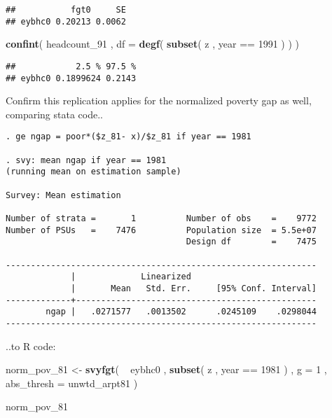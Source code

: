 \documentclass[]{book}
\newenvironment{Shaded}{\begin{snugshade}}{\end{snugshade}}
\newcommand{\KeywordTok}[1]{\textcolor[rgb]{0.13,0.29,0.53}{\textbf{{#1}}}}
\newcommand{\DataTypeTok}[1]{\textcolor[rgb]{0.13,0.29,0.53}{{#1}}}
\newcommand{\DecValTok}[1]{\textcolor[rgb]{0.00,0.00,0.81}{{#1}}}
\newcommand{\StringTok}[1]{\textcolor[rgb]{0.31,0.60,0.02}{{#1}}}
\newcommand{\NormalTok}[1]{{#1}}
\theoremstyle{definition}
\theoremstyle{definition}
\theoremstyle{remark}
\begin{document}
\begin{verbatim}
##           fgt0     SE
## eybhc0 0.20213 0.0062
\end{verbatim}

\begin{Shaded}
\begin{Highlighting}[]
\KeywordTok{confint}\NormalTok{( headcount_91 , }\DataTypeTok{df =} \KeywordTok{degf}\NormalTok{( }\KeywordTok{subset}\NormalTok{( z , year ==}\StringTok{ }\DecValTok{1991} \NormalTok{) ) )}
\end{Highlighting}
\end{Shaded}

\begin{verbatim}
##            2.5 % 97.5 %
## eybhc0 0.1899624 0.2143
\end{verbatim}

Confirm this replication applies for the normalized poverty gap as well,
comparing stata code..

\begin{verbatim}
. ge ngap = poor*($z_81- x)/$z_81 if year == 1981

. svy: mean ngap if year == 1981
(running mean on estimation sample)

Survey: Mean estimation

Number of strata =       1          Number of obs    =    9772
Number of PSUs   =    7476          Population size  = 5.5e+07
                                    Design df        =    7475

--------------------------------------------------------------
             |             Linearized
             |       Mean   Std. Err.     [95% Conf. Interval]
-------------+------------------------------------------------
        ngap |   .0271577   .0013502      .0245109    .0298044
--------------------------------------------------------------
\end{verbatim}

..to R code:

\begin{Shaded}
\begin{Highlighting}[]
\NormalTok{norm_pov_81 <-}\StringTok{ }
\StringTok{    }\KeywordTok{svyfgt}\NormalTok{( }
        \NormalTok{~}\StringTok{ }\NormalTok{eybhc0 , }
        \KeywordTok{subset}\NormalTok{( z , year ==}\StringTok{ }\DecValTok{1981} \NormalTok{) , }
        \DataTypeTok{g =} \DecValTok{1} \NormalTok{, }
        \DataTypeTok{abs_thresh =} \NormalTok{unwtd_arpt81}
    \NormalTok{)}
    
\NormalTok{norm_pov_81}
\end{Highlighting}
\end{Shaded}
\end{document}
